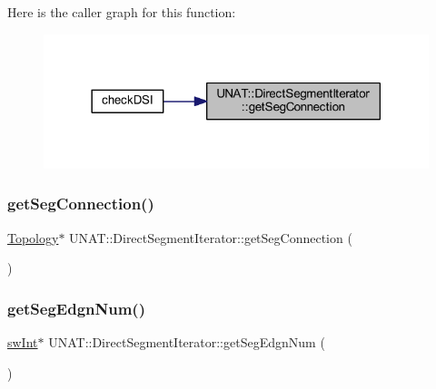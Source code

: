 Here is the caller graph for this function\+:
\nopagebreak
\begin{figure}[H]
\begin{center}
\leavevmode
\includegraphics[width=318pt]{classUNAT_1_1DirectSegmentIterator_aeddd507138479b1dad08053dd342bffb_icgraph}
\end{center}
\end{figure}
\mbox{\label{classUNAT_1_1DirectSegmentIterator_aeddd507138479b1dad08053dd342bffb}} 
\subsubsection{\texorpdfstring{getSegConnection()}{getSegConnection()}\hspace{0.1cm}{\footnotesize\ttfamily [2/2]}}
{\footnotesize\ttfamily \mbox{\hyperlink{classUNAT_1_1Topology}{Topology}}$\ast$ U\+N\+A\+T\+::\+Direct\+Segment\+Iterator\+::get\+Seg\+Connection (\begin{DoxyParamCaption}{ }\end{DoxyParamCaption})\hspace{0.3cm}{\ttfamily [inline]}}

\mbox{\label{classUNAT_1_1DirectSegmentIterator_ac3a4d43d27e6ba2a4bf68eb22af2c0ce}} 
\subsubsection{\texorpdfstring{getSegEdgnNum()}{getSegEdgnNum()}\hspace{0.1cm}{\footnotesize\ttfamily [1/2]}}
{\footnotesize\ttfamily \mbox{\hyperlink{include_2swMacro_8h_a113cf5f6b5377cdf3fac6aa4e443e9aa}{sw\+Int}}$\ast$ U\+N\+A\+T\+::\+Direct\+Segment\+Iterator\+::get\+Seg\+Edgn\+Num (\begin{DoxyParamCaption}{ }\end{DoxyParamCaption})\hspace{0.3cm}{\ttfamily [inline]}}

